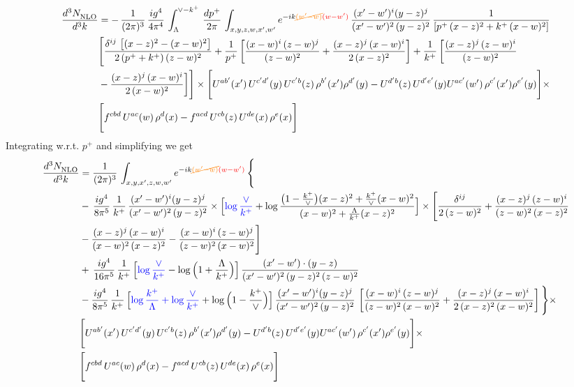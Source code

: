 \documentclass[9pt]{article}
\numberwithin{equation}{section}
\begin{document}
\begin{align}
    \frac{d^{3}N_{\rm NLO}^{\rm}}{d^{3}k}  & =  -\,\frac{1}{(2\pi)^{3}}\,\frac{ig^{4}}{4\pi^{4}}\, \int_{\Lambda}^{\vee-k^{+}}\, \frac{dp^{+}}{2\pi}\, \int_{x,y,z,w,x',w^{\prime}} e^{-ik{\color{orange}\cancel{(w^{\prime}-w)}}{\color{red}(w-w^{\prime})}}\, \frac{(x'-w')^{i}(y-z)^{j}}{(x'-w')^{2}\,(y-z)^{2}}\, \frac{1}{\left[p^{+}\,(x-z)^{2}+k^{+}\,(x-w)^{2}\right]}\notag \\ & \Bigg[\frac{\delta^{ij}\, \left[(x-z)^{2}-(x-w)^{2}\right]}{2\, (p^{+}+k^{+})\,(z-w)^{2}}+\frac{1}{p^{+}}\, \bigg[\frac{(x-w)^{i}\,(z-w)^{j}}{(z-w)^{2}}+\frac{(x-z)^{j}\,(x-w)^{i}}{2\,(x-z)^{2}}\bigg]+\frac{1}{k^{+}}\,\bigg[\frac{(x-z)^{j}\,(z-w)^{i}}{(z-w)^{2}}\notag \\ & -\frac{(x-z)^{j}\,(x-w)^{i}}{2\,(x-w)^{2}}\bigg]\Bigg]\times \Bigg[U^{ab'}(x')\,U^{c'd'}(y)\,U^{c'b}(z)\,\rho^{b'}(x')\rho^{d'}(y)-U^{d'b}(z)\,U^{d'e'}(y)U^{ac'}(w')\,\rho^{c'}(x')\rho^{e'}(y)\Bigg]\times \notag \\ & \Bigg[f^{cbd}\,U^{ac}(w)\,\rho^{d}(x)-f^{acd}\, U^{cb}(z)\,U^{de}(x)\,\rho^{e}(x)\Bigg]
\end{align}
Integrating w.r.t. $p^{+}$ and simplifying we get
\begin{align}
     \frac{d^{3}N_{\rm NLO}^{\rm}}{d^{3}k}  & =  \frac{1}{(2\pi)^{3}}\, \int_{x,y,x',z,w,w^{\prime}} e^{-ik{\color{orange}\cancel{(w^{\prime}-w)}}{\color{red}(w-w^{\prime})}}\, \Bigg\{\notag \\ & -\,\frac{ig^{4}}{8\pi^{5}}\,\frac{1}{k^{+}}\,\frac{(x'-w')^{i}(y-z)^{j}}{(x'-w')^{2}\,(y-z)^{2}}\times \Big[{\color{blue}\log\frac{\vee}{k^{+}}}+\log\frac{\big(1-\frac{k^{+}}{\vee}\big)(x-z)^{2}+\frac{k^{+}}{\vee}(x-w)^{2}}{(x-w)^{2}+\frac{\Lambda}{k^{+}}(x-z)^{2}}\Big]\times \Bigg[\frac{\delta^{ij}}{2\,(z-w)^{2}}+\frac{(x-z)^{j}\,(z-w)^{i}}{(z-w)^{2}\,(x-z)^{2}}\notag \\ & -\frac{(x-z)^{j}\,(x-w)^{i}}{(x-w)^{2}\,(x-z)^{2}}-\frac{(x-w)^{i}\,(z-w)^{j}}{(z-w)^{2}\,(x-w)^{2}}\Bigg]\notag \\ & +\,\frac{ig^{4}}{16\pi^{5}}\,\frac{1}{k^{+}}\,\Big[{\color{blue}\log\frac{\vee}{k^{+}}}-\log\Big(1+\frac{\Lambda}{k^{+}}\Big)\Big]\, \frac{(x'-w')\cdot (y-z)}{(x'-w')^{2}\,(y-z)^{2}\,(z-w)^{2}}\notag \\ & -\frac{ig^{4}}{8\pi^{5}}\,\frac{1}{k^{+}}\,\Big[{\color{blue}\log\frac{k^{+}}{\Lambda}+\log\frac{\vee}{k^{+}}}+\log\Big(1-\frac{k^{+}}{\vee}\Big)\Big]\,\frac{(x'-w')^{i}(y-z)^{j}}{(x'-w')^{2}\,(y-z)^{2}}\,\left[\frac{(x-w)^{i}\,(z-w)^{j}}{(z-w)^{2}\,(x-w)^{2}}+\frac{(x-z)^{j}\,(x-w)^{i}}{2\,(x-z)^{2}\, (x-w)^{2}}\right]\Bigg\}\times \notag \\ &  \Bigg[U^{ab'}(x')\,U^{c'd'}(y)\,U^{c'b}(z)\,\rho^{b'}(x')\rho^{d'}(y)-U^{d'b}(z)\,U^{d'e'}(y)U^{ac'}(w')\,\rho^{c'}(x')\rho^{e'}(y)\Bigg]\times\notag \\ & \Bigg[f^{cbd}\,U^{ac}(w)\,\rho^{d}(x)-f^{acd}\, U^{cb}(z)\,U^{de}(x)\,\rho^{e}(x)\Bigg] 
\end{align}
\end{document}
